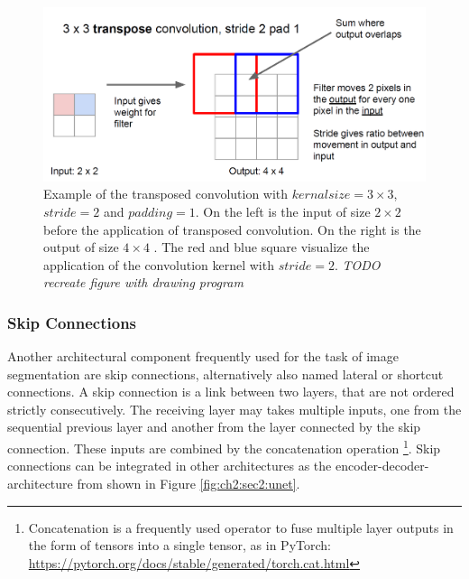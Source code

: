 \begin{figure}
	\includegraphics[width=\linewidth]{figures/chap223_transpose_conv.png}
	\caption[Transposed Convolution]{
		Example of the transposed convolution with $kernal size = 3 \times 3$, $stride = 2$ and $padding = 1$. 
		On the left is the input of size $2 \times 2$  before the application of transposed convolution.
		On the right is the output of size $4 \times 4$ . 
		The red and blue square visualize the application of the convolution kernel with $stride = 2$. 
		\textit{TODO recreate figure with drawing program}}
	\label{fig:ch2:sec2:transposed-conv}
\end{figure}


\subsubsection{Skip Connections} \label{ord:ch2:sec2:subsec3:skipconnections}
Another architectural component frequently used for the task of image segmentation are skip connections, alternatively also named lateral or shortcut connections.
A skip connection is a link between two layers, that are not ordered strictly consecutively. 
The receiving layer may takes multiple inputs, one from the sequential previous layer and another from the layer connected by the skip connection.
These inputs are combined by the concatenation operation
\footnote{Concatenation is a frequently used operator to fuse multiple layer outputs in the form of tensors into a single tensor, as in PyTorch: \url{https://pytorch.org/docs/stable/generated/torch.cat.html}}.
Skip connections can be integrated in other architectures as \eg the encoder-decoder-architecture from \cite{RF15-U-Net} shown in Figure \ref{fig:ch2:sec2:unet}.


